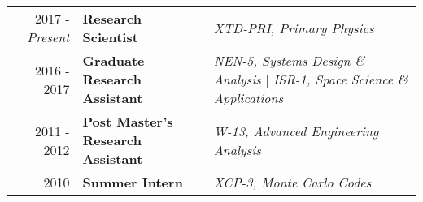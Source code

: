 %
%

\normalsize



\begin{minipage}{\textwidth}
     \begin{tabular}{r|ll}
	     2017 - \emph{Present} & \textbf{Research Scientist}  & \textit{XTD-PRI, Primary Physics}  \\
	     2016 - 2017 & \textbf{Graduate Research Assistant}  & \textit{NEN-5, Systems Design \& Analysis} | 
									     \textit{ISR-1, Space Science \& Applications} \\
	     2011 - 2012 & \textbf{Post Master's Research Assistant}  & \textit{W-13, Advanced Engineering Analysis} \\
	     2010 & \textbf{Summer Intern} & \textit{XCP-3, Monte Carlo Codes} \\
     \end{tabular}
\end{minipage}

